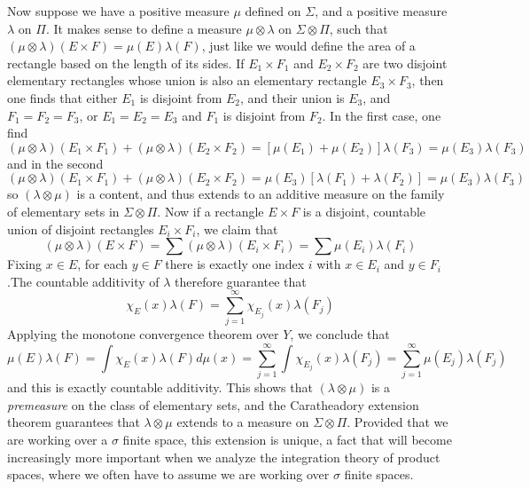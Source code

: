 Now suppose we have a positive measure $\mu$ defined on $\Sigma$, and a positive measure $\lambda$ on $\Pi$. It makes sense to define a measure $\mu \otimes \lambda$ on $\Sigma \otimes \Pi$, such that $(\mu \otimes \lambda)(E \times F) = \mu(E) \lambda(F)$, just like we would define the area of a rectangle based on the length of its sides. If $E_1 \times F_1$ and $E_2 \times F_2$ are two disjoint elementary rectangles whose union is also an elementary rectangle $E_3 \times F_3$, then one finds that either $E_1$ is disjoint from $E_2$, and their union is $E_3$, and $F_1 = F_2 = F_3$, or $E_1 = E_2 = E_3$ and $F_1$ is disjoint from $F_2$. In the first case, one find
%
\[ (\mu \otimes \lambda)(E_1 \times F_1) + (\mu \otimes \lambda)(E_2 \times F_2) = [\mu(E_1) + \mu(E_2)] \lambda(F_3) = \mu(E_3) \lambda(F_3) \]
%
and in the second
%
\[ (\mu \otimes \lambda)(E_1 \times F_1) + (\mu \otimes \lambda)(E_2 \times F_2) = \mu(E_3) [\lambda(F_1) + \lambda(F_2)] = \mu(E_3) \lambda(F_3) \]
%
so $(\lambda \otimes \mu)$ is a content, and thus extends to an additive measure on the family of elementary sets in $\Sigma \otimes \Pi$. Now if a rectangle $E \times F$ is a disjoint, countable union of disjoint rectangles $E_i \times F_i$, we claim that
%
\[ (\mu \otimes \lambda)(E \times F) = \sum (\mu \otimes \lambda)(E_i \times F_i) = \sum \mu(E_i) \lambda(F_i) \]
%
Fixing $x \in E$, for each $y \in F$ there is exactly one index $i$ with $x \in E_i$ and $y \in F_i$.The countable additivity of $\lambda$ therefore guarantee that
%
\[ \chi_E(x) \lambda(F) = \sum_{j = 1}^\infty \chi_{E_j}(x) \lambda(F_j) \]
%
Applying the monotone convergence theorem over $Y$, we conclude that
%
\[ \mu(E) \lambda(F) = \int \chi_E(x) \lambda(F) d\mu(x) = \sum_{j = 1}^\infty \int \chi_{E_j}(x) \lambda(F_j) = \sum_{j = 1}^\infty \mu(E_j) \lambda(F_j) \]
%
and this is exactly countable additivity. This shows that $(\lambda \otimes \mu)$ is a {\it premeasure} on the class of elementary sets, and the Caratheadory extension theorem guarantees that $\lambda \otimes \mu$ extends to a measure on $\Sigma \otimes \Pi$. Provided that we are working over a $\sigma$ finite space, this extension is unique, a fact that will become increasingly more important when we analyze the integration theory of product spaces, where we often have to assume we are working over $\sigma$ finite spaces.

